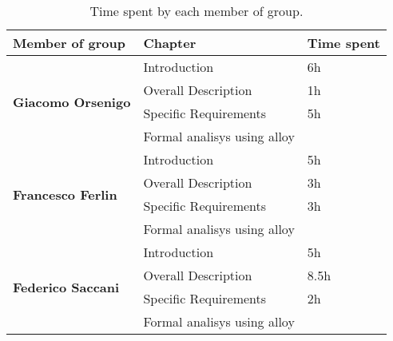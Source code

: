\begin{table}[H]
    \centering
    \begin{tabular}{|l|l|l|}
        \hline
        \textbf{Member of group }                  & \textbf{Chapter}            & \textbf{Time spent} \\\hline
        \multirow{4}{*}{\textbf{Giacomo Orsenigo}} & Introduction                & 6h                  \\
                                                   & Overall Description         & 1h                  \\
                                                   & Specific Requirements       & 5h                  \\
                                                   & Formal analisys using alloy &                     \\\hline
        \multirow{4}{*}{\textbf{Francesco Ferlin}} & Introduction                & 5h                  \\
                                                   & Overall Description         & 3h                  \\
                                                   & Specific Requirements       & 3h                  \\
                                                   & Formal analisys using alloy &                     \\\hline
        \multirow{4}{*}{\textbf{Federico Saccani}} & Introduction                & 5h                   \\
                                                   & Overall Description         & 8.5h                  \\
                                                   & Specific Requirements       & 2h                    \\
                                                   & Formal analisys using alloy &                     \\\hline
    \end{tabular}
    \caption{Time spent by each member of group.}
    \label{table:Time spent}
\end{table}
